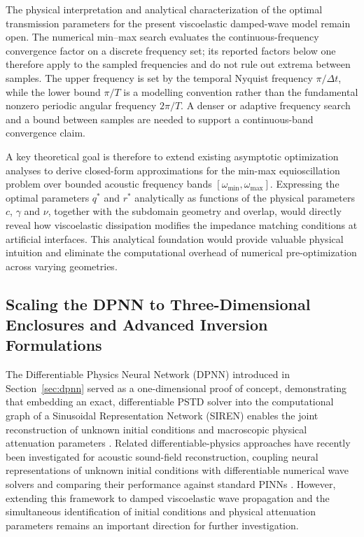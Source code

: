 \documentclass{Configuration_Files/PoliMi3i_thesis}
\newif\ifshowthesischanges
\DeclareRobustCommand{\thesischange}[2]{%
    \ifshowthesischanges
        \textcolor{#1}{#2}%
    \else
        #2%
    \fi
}
\def\thesischange#1#2{#2}%
\begin{document}
\thesischange{red}{The physical interpretation and analytical characterization of the optimal transmission parameters for the present viscoelastic damped-wave model remain open. The numerical min--max search evaluates the continuous-frequency convergence factor on a discrete frequency set; its reported factors below one therefore apply to the sampled frequencies and do not rule out extrema between samples. The upper frequency is set by the temporal Nyquist frequency $\pi/\Delta t$, while the lower bound $\pi/T$ is a modelling convention rather than the fundamental nonzero periodic angular frequency $2\pi/T$. A denser or adaptive frequency search and a bound between samples are needed to support a continuous-band convergence claim.}

\thesischange{red}{A key theoretical goal is therefore to extend existing asymptotic optimization analyses to derive closed-form approximations for the min-max equioscillation problem over bounded acoustic frequency bands $[\omega_{\min},\omega_{\max}]$. Expressing the optimal parameters $q^*$ and $r^*$ analytically as functions of the physical parameters $c$, $\gamma$ and $\nu$, together with the subdomain geometry and overlap, would directly reveal how viscoelastic dissipation modifies the impedance matching conditions at artificial interfaces. This analytical foundation would provide valuable physical intuition and eliminate the computational overhead of numerical pre-optimization across varying geometries.}

\subsection{\thesischange{red}{Scaling the DPNN to Three-Dimensional Enclosures and Advanced Inversion Formulations}}

\thesischange{red}{The Differentiable Physics Neural Network (DPNN) introduced in Section~\ref{sec:dpnn} served as a one-dimensional proof of concept, demonstrating that embedding an exact, differentiable PSTD solver into the computational graph of a Sinusoidal Representation Network (SIREN) enables the joint reconstruction of unknown initial conditions and macroscopic physical attenuation parameters \citep{sitzmann_implicit_2020}. Related differentiable-physics approaches have recently been investigated for acoustic sound-field reconstruction, coupling neural representations of unknown initial conditions with differentiable numerical wave solvers and comparing their performance against standard PINNs \citep{verburg_differentiable_2025}. However, extending this framework to damped viscoelastic wave propagation and the simultaneous identification of initial conditions and physical attenuation parameters remains an important direction for further investigation.}
\end{document}
